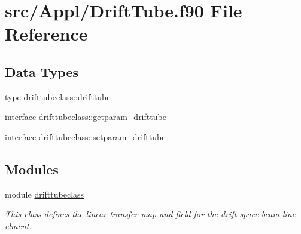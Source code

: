 \hypertarget{_drift_tube_8f90}{}\section{src/\+Appl/\+Drift\+Tube.f90 File Reference}
\label{_drift_tube_8f90}
\subsection*{Data Types}
\begin{DoxyCompactItemize}
\item 
type \mbox{\hyperlink{namespacedrifttubeclass_structdrifttubeclass_1_1drifttube}{drifttubeclass\+::drifttube}}
\item 
interface \mbox{\hyperlink{interfacedrifttubeclass_1_1getparam__drifttube}{drifttubeclass\+::getparam\+\_\+drifttube}}
\item 
interface \mbox{\hyperlink{interfacedrifttubeclass_1_1setparam__drifttube}{drifttubeclass\+::setparam\+\_\+drifttube}}
\end{DoxyCompactItemize}
\subsection*{Modules}
\begin{DoxyCompactItemize}
\item 
module \mbox{\hyperlink{namespacedrifttubeclass}{drifttubeclass}}
\begin{DoxyCompactList}\small\item\em This class defines the linear transfer map and field for the drift space beam line elment. \end{DoxyCompactList}\end{DoxyCompactItemize}
